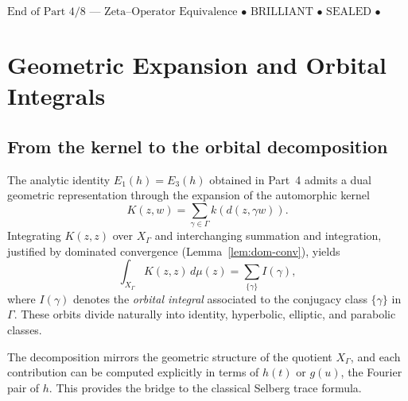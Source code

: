 \begin{center}
\(\boxed{\text{End of Part 4/8 — Zeta–Operator Equivalence • BRILLIANT • SEALED • v4.3.0}}\)
\end{center}


\section{Geometric Expansion and Orbital Integrals}
\label{sec:ch4-part5-geometric-expansion}
\relax \hspace{0pt}

\subsection{From the kernel to the orbital decomposition}
\label{subsec:ch4-part5-kernel-decomposition}
\relax

The analytic identity \(E_1(h)=E_3(h)\) obtained in Part~4 admits a dual geometric representation through the expansion of the automorphic kernel
\[
K(z,w)=\sum_{\gamma\in\Gamma}k(d(z,\gamma w)).
\]
Integrating $K(z,z)$ over $X_\Gamma$ and interchanging summation and integration, justified by dominated convergence (Lemma~\ref{lem:dom-conv}), yields
\[
\int_{X_\Gamma}K(z,z)\,d\mu(z)
=\sum_{\{\gamma\}}I(\gamma),
\]
where $I(\gamma)$ denotes the \emph{orbital integral} associated to the conjugacy class $\{\gamma\}$ in $\Gamma$.  
These orbits divide naturally into identity, hyperbolic, elliptic, and parabolic classes.

\begin{remark}
The decomposition mirrors the geometric structure of the quotient $X_\Gamma$, and each contribution can be computed explicitly in terms of $h(t)$ or $g(u)$, the Fourier pair of $h$.  
This provides the bridge to the classical Selberg trace formula.
\end{remark}

